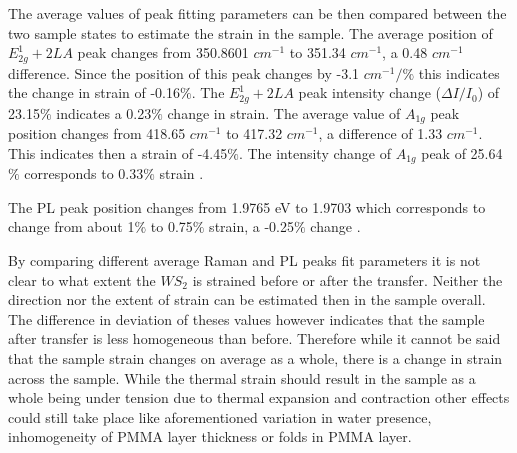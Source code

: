 The average values of peak fitting parameters can be then compared between the two sample states to estimate the strain in the sample. The average position of $E^1_{2g} + 2LA$ peak changes from 350.8601 $cm^{-1}$ to 351.34 $cm^{-1}$, a 0.48 $cm^{-1}$ difference. Since the position of this peak changes by -3.1 $cm^{-1} / \%$ this indicates the change in strain of -0.16$\%$. The $E^1_{2g} + 2LA$ peak intensity change ($\Delta I / I_0$) of 23.15$\%$ indicates a 0.23$\%$ change in strain. The average value of $A_{1g}$ peak position changes from 418.65 $cm^{-1}$ to 417.32 $cm^{-1}$, a difference of 1.33 $cm^{-1}$. This indicates then a strain of -4.45$\%$. The intensity change of $A_{1g}$ peak of 25.64$\%$ corresponds to 0.33$\%$ strain \cite{Dadgar2018}.
	
The PL peak position changes from 1.9765 eV to 1.9703 which corresponds to change from about 1$\%$ to 0.75$\%$ strain, a -0.25$\%$ change \cite{Aslan2018}.
	
By comparing different average Raman and PL peaks fit parameters it is not clear to what extent the $WS_2$ is strained before or after the transfer. Neither the direction nor the extent of strain can be estimated then in the sample overall. The difference in deviation of theses values however indicates that the sample after transfer is less homogeneous than before. Therefore while it cannot be said that the sample strain changes on average as a whole, there is a change in strain across the sample. While the thermal strain should result in the sample as a whole being under tension due to thermal expansion and contraction other effects could still take place like aforementioned variation in water presence, inhomogeneity of PMMA layer thickness or folds in PMMA layer.
	
